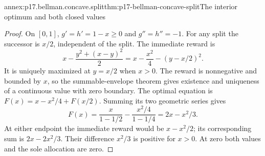 \begin{annexitem}{annex:p17.bellman.concave.split}{thm:p17-bellman-concave-split}{The interior optimum and both closed values}
\begin{proof}
On \([0,1]\), \(g'=h'=1-x\geq0\)
and \(g''=h''=-1\).
For any split the successor
is \(x/2\), independent of
the split. The immediate
reward is
\[
 x-\frac{y^2+(x-y)^2}{2}
                   =x-\frac{x^2}{4}-(y-x/2)^2.
\]
It is uniquely maximized at
\(y=x/2\) when \(x>0\).
The reward is nonnegative
and bounded by \(x\), so
the summable-envelope theorem
gives existence and uniqueness
of a continuous value with
zero boundary.
The optimal equation is
\(F(x)=x-x^2/4+F(x/2)\).
Summing its two geometric
series gives
\[
           F(x)=\frac{x}{1-1/2}
                    -\frac{x^2/4}{1-1/4}
                         =2x-x^2/3.
\]
At either endpoint the
immediate reward would be
\(x-x^2/2\); its corresponding
sum is \(2x-2x^2/3\).
Their difference \(x^2/3\)
is positive for \(x>0\).
At zero both values and
the sole allocation are zero.
\end{proof}
\end{annexitem}


